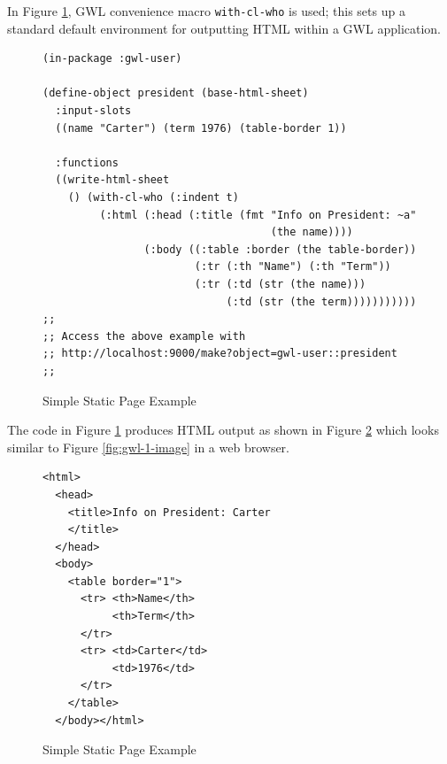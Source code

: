 \documentclass [11pt]{book}
\begin{document}
\label{subsec:asimplestaticpageexample}



In Figure 
\ref{fig:gwl-1}, GWL convenience macro \texttt{with-cl-who} is used; this sets up a standard default environment for outputting HTML 
within a GWL application.
\begin{figure}
\begin{lrbox}{\boxedverb}
\begin{minipage}{\linewidth}
{\small

\begin{verbatim}(in-package :gwl-user)

(define-object president (base-html-sheet)
  :input-slots
  ((name "Carter") (term 1976) (table-border 1))

  :functions
  ((write-html-sheet
    () (with-cl-who (:indent t)
         (:html (:head (:title (fmt "Info on President: ~a" 
                                    (the name))))
                (:body ((:table :border (the table-border))
                        (:tr (:th "Name") (:th "Term"))
                        (:tr (:td (str (the name))) 
                             (:td (str (the term)))))))))))
;;
;; Access the above example with 
;; http://localhost:9000/make?object=gwl-user::president
;;

\end{verbatim}}
\end{minipage}
\end{lrbox}
\fbox{\usebox{\boxedverb}}

\caption{Simple Static Page Example}

\label{fig:gwl-1}

\end{figure}




The code in Figure 
\ref{fig:gwl-1} produces HTML output as shown in Figure 
\ref{fig:gwl-1-html} which looks similar to Figure 
\ref{fig:gwl-1-image} in a web browser.
\begin{figure}
\begin{lrbox}{\boxedverb}
\begin{minipage}{\linewidth}
{\small

\begin{verbatim}
<html>
  <head>
    <title>Info on President: Carter
    </title>
  </head>
  <body>
    <table border="1">
      <tr> <th>Name</th>
           <th>Term</th>
      </tr>
      <tr> <td>Carter</td>
           <td>1976</td>
      </tr>
    </table>
  </body></html>

\end{verbatim}}
\end{minipage}
\end{lrbox}
\fbox{\usebox{\boxedverb}}

\caption{Simple Static Page Example}

\label{fig:gwl-1-html}

\end{figure}
\end{document}
